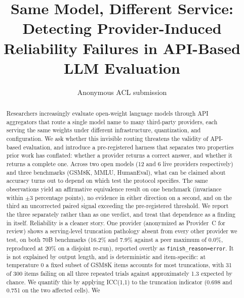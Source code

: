 \documentclass[11pt]{article}
\title{Same Model, Different Service: Detecting Provider-Induced\\
Reliability Failures in API-Based LLM Evaluation}
\author{Anonymous ACL submission}
\begin{document}
\maketitle
\raggedbottom
\setlength{\dbltextfloatsep}{5pt plus 1pt minus 1pt}
\setlength{\textfloatsep}{5pt plus 1pt minus 1pt}
\setlength{\floatsep}{3pt plus 1pt minus 1pt}
\setlength{\abovedisplayskip}{4pt plus 1pt minus 1pt}
\setlength{\belowdisplayskip}{4pt plus 1pt minus 1pt}
\setlength{\abovedisplayshortskip}{2pt plus 1pt minus 1pt}
\setlength{\belowdisplayshortskip}{2pt plus 1pt minus 1pt}
\setlength{\abovecaptionskip}{4pt plus 1pt minus 1pt}
\setlength{\belowcaptionskip}{2pt plus 1pt minus 1pt}

\begin{abstract}
Researchers increasingly evaluate open-weight language models through
API aggregators that route a single model name to many third-party
providers, each serving the same weights under different
infrastructure, quantization, and configuration. We ask whether this
invisible routing threatens the validity of API-based evaluation, and
introduce a pre-registered harness that separates two properties prior
work has conflated: whether a provider returns a correct answer, and
whether it returns a complete one. Across two open models (12 and 6
live providers respectively) and three benchmarks (GSM8K, MMLU,
HumanEval), what can be claimed about accuracy turns out to depend on
which test the protocol specifies. The same observations yield an
affirmative equivalence result on one benchmark (invariance within
$\pm$3 percentage points), no evidence in either direction on a
second, and on the third an uncorrected paired signal exceeding the
pre-registered threshold. We report the three separately rather than
as one verdict, and treat that dependence as a finding in itself.
Reliability is a cleaner story. One provider (anonymized as
Provider~C for review) shows a serving-level truncation pathology
absent from every other provider we test, on both 70B benchmarks
(16.2\% and 7.9\% against a peer maximum of 0.0\%, reproduced at 20\%
on a disjoint re-run), reported overtly as
\texttt{finish\_reason=error}. It is not explained by output length,
and is deterministic and item-specific: at temperature 0 a fixed
subset of GSM8K items accounts for most truncations, with 31 of 300
items failing on all three repeated trials against approximately 1.3
expected by chance. We quantify this by applying ICC(1,1) to the
truncation indicator (0.698 and 0.751 on the two affected cells). We

\end{abstract}
\end{document}
